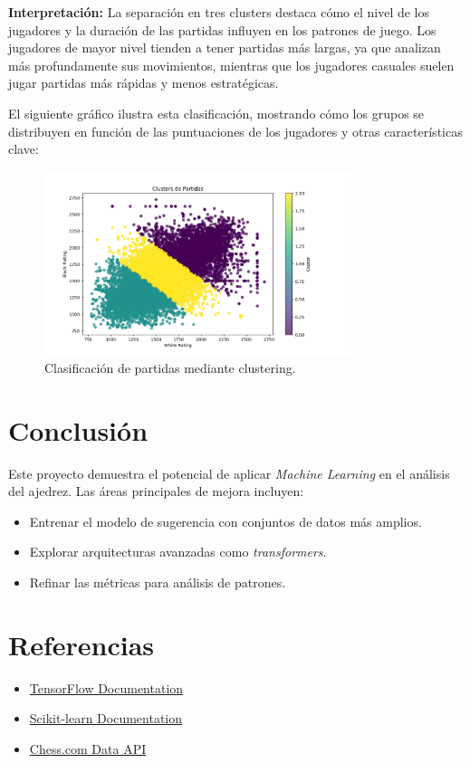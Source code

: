 \documentclass[a4paper,12pt]{article}
\begin{document}
\newpage

\textbf{Interpretación:} La separación en tres clusters destaca cómo el nivel de los jugadores y la duración de las partidas influyen en los patrones de juego. Los jugadores de mayor nivel tienden a tener partidas más largas, ya que analizan más profundamente sus movimientos, mientras que los jugadores casuales suelen jugar partidas más rápidas y menos estratégicas.

El siguiente gráfico ilustra esta clasificación, mostrando cómo los grupos se distribuyen en función de las puntuaciones de los jugadores y otras características clave:

\begin{figure}[H]
    \centering
    \includegraphics[width=0.8\textwidth]{../images/Figure_1_clustersPartidas.png}
    \caption{Clasificación de partidas mediante clustering.}
    \label{fig:clustering}
\end{figure}

\newpage

\section{Conclusión}

Este proyecto demuestra el potencial de aplicar \textit{Machine Learning} en el análisis del ajedrez. Las áreas principales de mejora incluyen:
\begin{itemize}
    \item Entrenar el modelo de sugerencia con conjuntos de datos más amplios.
    \item Explorar arquitecturas avanzadas como \textit{transformers}.
    \item Refinar las métricas para análisis de patrones.
\end{itemize}

\section*{Referencias}

\begin{itemize}
    \item \href{https://tensorflow.org}{TensorFlow Documentation}
    \item \href{https://scikit-learn.org}{Scikit-learn Documentation}
    \item \href{https://www.chess.com}{Chess.com Data API}
\end{itemize}
\end{document}
